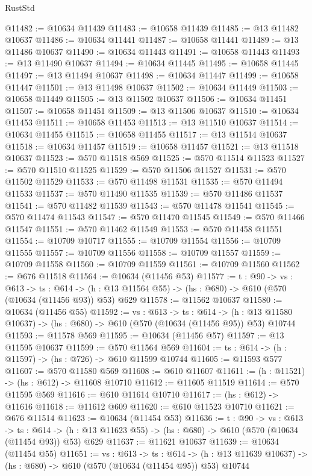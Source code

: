 \begin{lexlean}{RustStd}
\begin{coremodule}
@11482 := @10634 @11439
@11483 := @10658 @11439
@11485 := @13 @11482 @10637
@11486 := @10634 @11441
@11487 := @10658 @11441
@11489 := @13 @11486 @10637
@11490 := @10634 @11443
@11491 := @10658 @11443
@11493 := @13 @11490 @10637
@11494 := @10634 @11445
@11495 := @10658 @11445
@11497 := @13 @11494 @10637
@11498 := @10634 @11447
@11499 := @10658 @11447
@11501 := @13 @11498 @10637
@11502 := @10634 @11449
@11503 := @10658 @11449
@11505 := @13 @11502 @10637
@11506 := @10634 @11451
@11507 := @10658 @11451
@11509 := @13 @11506 @10637
@11510 := @10634 @11453
@11511 := @10658 @11453
@11513 := @13 @11510 @10637
@11514 := @10634 @11455
@11515 := @10658 @11455
@11517 := @13 @11514 @10637
@11518 := @10634 @11457
@11519 := @10658 @11457
@11521 := @13 @11518 @10637
@11523 := @570 @11518 @569
@11525 := @570 @11514 @11523
@11527 := @570 @11510 @11525
@11529 := @570 @11506 @11527
@11531 := @570 @11502 @11529
@11533 := @570 @11498 @11531
@11535 := @570 @11494 @11533
@11537 := @570 @11490 @11535
@11539 := @570 @11486 @11537
@11541 := @570 @11482 @11539
@11543 := @570 @11478 @11541
@11545 := @570 @11474 @11543
@11547 := @570 @11470 @11545
@11549 := @570 @11466 @11547
@11551 := @570 @11462 @11549
@11553 := @570 @11458 @11551
@11554 := @10709 @10717
@11555 := @10709 @11554
@11556 := @10709 @11555
@11557 := @10709 @11556
@11558 := @10709 @11557
@11559 := @10709 @11558
@11560 := @10709 @11559
@11561 := @10709 @11560
@11562 := @676 @11518
@11564 := @10634 (@11456 @53)
@11577 := {t : @90} ->
  {vs : @613} ->
  {ts : @614} -> (h : @13 @11564 @55) -> (hs : @680) -> @610 (@570 (@10634 (@11456 @93)) @53) @629
@11578 := @11562 @10637
@11580 := @10634 (@11456 @55)
@11592 := {vs : @613} ->
  {ts : @614} ->
  (h : @13 @11580 @10637) -> (hs : @680) -> @610 (@570 (@10634 (@11456 @95)) @53) @10744
@11593 := @11578 @569
@11595 := @10634 (@11456 @57)
@11597 := @13 @11595 @10637
@11599 := @570 @11564 @569
@11604 := {ts : @614} -> (h : @11597) -> (hs : @726) -> @610 @11599 @10744
@11605 := @11593 @577
@11607 := @570 @11580 @569
@11608 := @610 @11607
@11611 := (h : @11521) -> (hs : @612) -> @11608 @10710
@11612 := @11605 @11519
@11614 := @570 @11595 @569
@11616 := @610 @11614 @10710
@11617 := (hs : @612) -> @11616
@11618 := @11612 @609
@11620 := @610 @11523 @10710
@11621 := @676 @11514
@11623 := @10634 (@11454 @53)
@11636 := {t : @90} ->
  {vs : @613} ->
  {ts : @614} -> (h : @13 @11623 @55) -> (hs : @680) -> @610 (@570 (@10634 (@11454 @93)) @53) @629
@11637 := @11621 @10637
@11639 := @10634 (@11454 @55)
@11651 := {vs : @613} ->
  {ts : @614} ->
  (h : @13 @11639 @10637) -> (hs : @680) -> @610 (@570 (@10634 (@11454 @95)) @53) @10744

\end{coremodule}
\end{lexlean}
